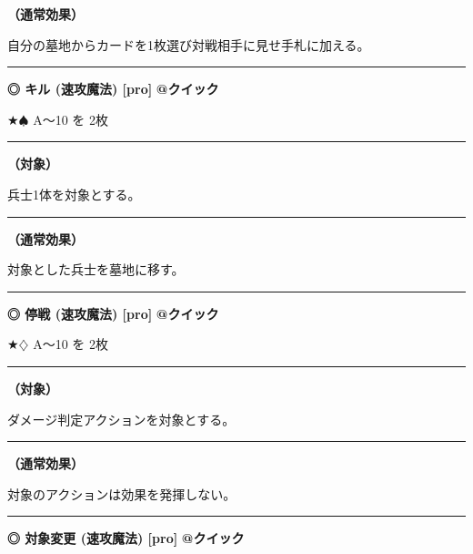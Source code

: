 \documentclass[twocolumn,a5paper,papersize,10pt]{jarticle}
\begin{document}
{\bf（通常効果）}

自分の墓地からカードを1枚選び対戦相手に見せ手札に加える。
\vspace{2mm} %
\hrule height 0.5mm depth 0mm width 66.5mm %
\vspace{1mm} %
{\normalsize\bf ◎ キル {\scriptsize (速攻魔法) [pro]}} %
\hfill 
{\small\bf @クイック }

★{\normalsize $\spadesuit$} A〜10 を 2枚

\vspace{1mm}%
\hrule height 0.1mm depth 0mm width 66.5mm %
\vspace{1mm}%
{\bf（対象）}

兵士1体を対象とする。
\vspace{1mm}%
\hrule height 0.1mm depth 0mm width 66.5mm %
\vspace{1mm}%

{\bf（通常効果）}

対象とした兵士を墓地に移す。
\vspace{2mm} %
\hrule height 0.5mm depth 0mm width 66.5mm %
\vspace{1mm} %
{\normalsize\bf ◎ 停戦 {\scriptsize (速攻魔法) [pro]}} %
\hfill 
{\small\bf @クイック }

★{\normalsize $\diamondsuit$} A〜10 を 2枚

\vspace{1mm}%
\hrule height 0.1mm depth 0mm width 66.5mm %
\vspace{1mm}%
{\bf（対象）}

ダメージ判定アクションを対象とする。
\vspace{1mm}%
\hrule height 0.1mm depth 0mm width 66.5mm %
\vspace{1mm}%

{\bf（通常効果）}

対象のアクションは効果を発揮しない。
\vspace{2mm} %
\hrule height 0.5mm depth 0mm width 66.5mm %
\vspace{1mm} %
{\normalsize\bf ◎ 対象変更 {\scriptsize (速攻魔法) [pro]}} %
\hfill 
{\small\bf @クイック }
\end{document}
